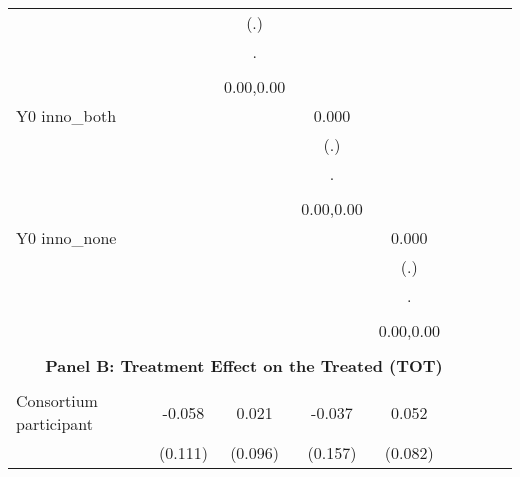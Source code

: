 \begin{table}[!h]
\begin{adjustbox}{width=\columnwidth,center}
\begin{tabular}{l*{8}{c}}
                    &                     &         (.)         &                     &                     \\
                    &                     &           .         &                     &                     \\
                    &                     &                     &                     &                     \\
                    &                     &   0.00,0.00         &                     &                     \\
Y0 inno\_both        &                     &                     &       0.000         &                     \\
                    &                     &                     &         (.)         &                     \\
                    &                     &                     &           .         &                     \\
                    &                     &                     &                     &                     \\
                    &                     &                     &   0.00,0.00         &                     \\
Y0 inno\_none        &                     &                     &                     &       0.000         \\
                    &                     &                     &                     &         (.)         \\
                    &                     &                     &                     &           .         \\
                    &                     &                     &                     &                     \\
                    &                     &                     &                     &   0.00,0.00         \\
\hline \\ \multicolumn{7}{c}{\textbf{Panel B: Treatment Effect on the Treated (TOT)}} \\\\[-1ex]
Consortium participant&      -0.058         &       0.021         &      -0.037         &       0.052         \\
                    &     (0.111)         &     (0.096)         &     (0.157)         &     (0.082)         \\

\end{tabular}
\end{adjustbox}
\end{table}

